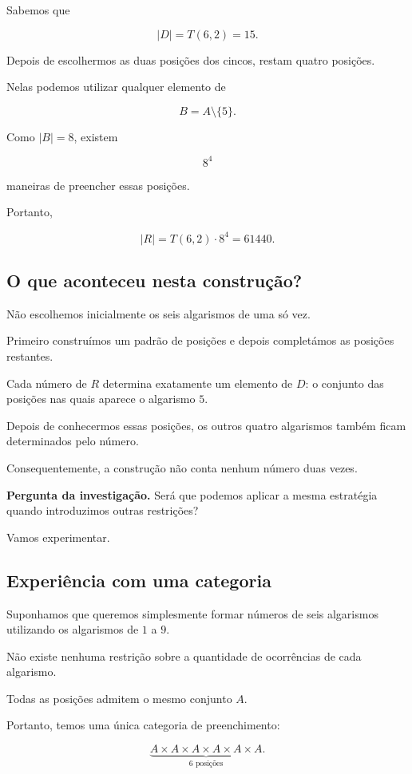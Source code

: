 \documentclass[11pt,a4paper,oneside]{book}
\newcommand{\Pergunta}[1]{\begin{perguntabox}\textbf{Pergunta da investigação.} #1\end{perguntabox}}
\newcommand{\card}[1]{\lvert #1\rvert}
\begin{document}
Sabemos que

\[
\card D=T(6,2)=15.
\]

Depois de escolhermos as duas posições
dos cincos, restam quatro posições.

Nelas podemos utilizar qualquer
elemento de

\[
B=A\setminus\{5\}.
\]

Como $\card B=8$, existem

\[
8^4
\]

maneiras de preencher essas posições.

Portanto,

\[
\boxed{\card R=T(6,2)\cdot8^4=61440}.
\]

\subsection*{O que aconteceu nesta construção?}

Não escolhemos inicialmente
os seis algarismos de uma só vez.

Primeiro construímos um padrão
de posições e depois completámos
as posições restantes.

Cada número de $R$ determina
exatamente um elemento de $D$:
o conjunto das posições
nas quais aparece o algarismo $5$.

Depois de conhecermos essas posições,
os outros quatro algarismos também
ficam determinados pelo número.

Consequentemente, a construção
não conta nenhum número duas vezes.

\Pergunta{Será que podemos aplicar
a mesma estratégia quando
introduzimos outras restrições?}

Vamos experimentar.

\subsection*{Experiência com uma categoria}

Suponhamos que queremos simplesmente
formar números de seis algarismos
utilizando os algarismos de $1$ a $9$.

Não existe nenhuma restrição
sobre a quantidade de ocorrências
de cada algarismo.

Todas as posições admitem
o mesmo conjunto $A$.

Portanto, temos uma única
categoria de preenchimento:

\[
\underbrace{A\times A\times A
\times A\times A\times A}_{6\text{ posições}}.
\]
\end{document}
